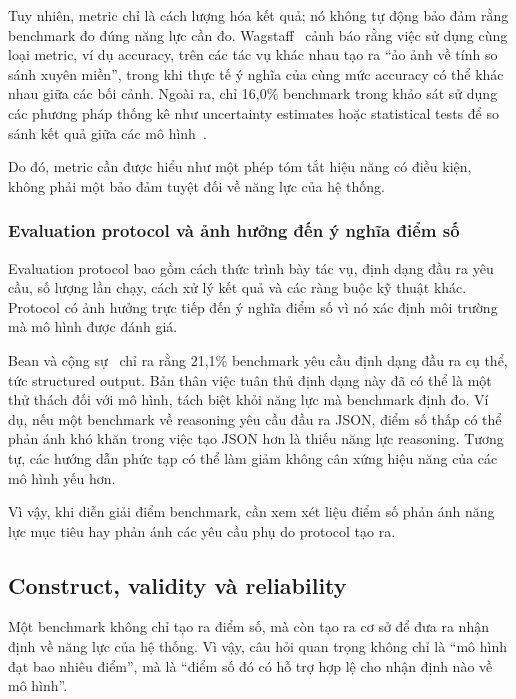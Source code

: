 Tuy nhiên, metric chỉ là cách lượng hóa kết quả; nó không tự động bảo đảm rằng benchmark đo đúng năng lực cần đo. Wagstaff~\cite{everything_benchmark} cảnh báo rằng việc sử dụng cùng loại metric, ví dụ accuracy, trên các tác vụ khác nhau tạo ra ``ảo ảnh về tính so sánh xuyên miền'', trong khi thực tế ý nghĩa của cùng mức accuracy có thể khác nhau giữa các bối cảnh. Ngoài ra, chỉ 16,0\% benchmark trong khảo sát sử dụng các phương pháp thống kê như uncertainty estimates hoặc statistical tests để so sánh kết quả giữa các mô hình~\cite{measuring_what_matters}.

Do đó, metric cần được hiểu như một phép tóm tắt hiệu năng có điều kiện, không phải một bảo đảm tuyệt đối về năng lực của hệ thống.

\subsubsection{Evaluation protocol và ảnh hưởng đến ý nghĩa điểm số}
\label{sec:protocol}

Evaluation protocol bao gồm cách thức trình bày tác vụ, định dạng đầu ra yêu cầu, số lượng lần chạy, cách xử lý kết quả và các ràng buộc kỹ thuật khác. Protocol có ảnh hưởng trực tiếp đến ý nghĩa điểm số vì nó xác định môi trường mà mô hình được đánh giá.

Bean và cộng sự~\cite{measuring_what_matters} chỉ ra rằng 21,1\% benchmark yêu cầu định dạng đầu ra cụ thể, tức structured output. Bản thân việc tuân thủ định dạng này đã có thể là một thử thách đối với mô hình, tách biệt khỏi năng lực mà benchmark định đo. Ví dụ, nếu một benchmark về reasoning yêu cầu đầu ra JSON, điểm số thấp có thể phản ánh khó khăn trong việc tạo JSON hơn là thiếu năng lực reasoning. Tương tự, các hướng dẫn phức tạp có thể làm giảm không cân xứng hiệu năng của các mô hình yếu hơn.

Vì vậy, khi diễn giải điểm benchmark, cần xem xét liệu điểm số phản ánh năng lực mục tiêu hay phản ánh các yêu cầu phụ do protocol tạo ra.

\subsection{Construct, validity và reliability}
\label{sec:construct_validity_reliability}

Một benchmark không chỉ tạo ra điểm số, mà còn tạo ra cơ sở để đưa ra nhận định về năng lực của hệ thống. Vì vậy, câu hỏi quan trọng không chỉ là ``mô hình đạt bao nhiêu điểm'', mà là ``điểm số đó có hỗ trợ hợp lệ cho nhận định nào về mô hình''.

